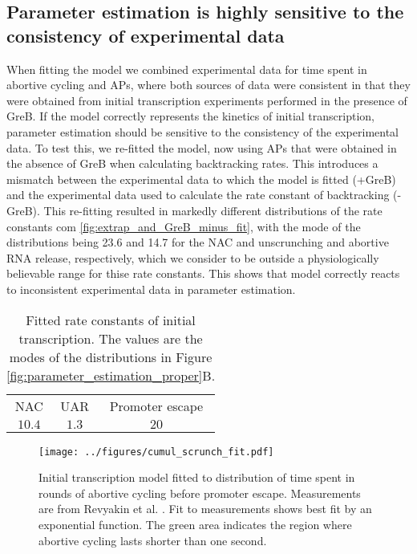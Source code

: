 \subsection{Parameter estimation is highly sensitive to the consistency of experimental data}
When fitting the model we combined experimental data for time spent in
abortive cycling and APs, where both sources of data were consistent in that
they were obtained from initial transcription experiments performed in the
presence of GreB. If the model correctly represents the kinetics of initial
transcription, parameter estimation should be sensitive to the consistency of
the experimental data. To test this, we re-fitted the model, now using APs
that were obtained in the absence of GreB when calculating backtracking rates.
This introduces a mismatch between the experimental data to which the model is
fitted (+GreB) and the experimental data used to calculate the rate constant
of backtracking (-GreB). This re-fitting resulted in markedly different
distributions of the rate constants com \ref{fig:extrap_and_GreB_minus_fit},
with the mode of the distributions being 23.6 and 14.7 for the NAC and
unscrunching and abortive RNA release, respectively, which we consider to be
outside a physiologically believable range for thise rate constants. This
shows that model correctly reacts to inconsistent experimental data in
parameter estimation.

\begin{table}
  \label{tab:param_fit_revyakin}
  \caption{Fitted rate constants of initial transcription. The values are the
    modes of the distributions in Figure \ref{fig:parameter_estimation_proper}B.}
  \begin{center}
    \begin{tabular}{ccc}
       \toprule
       NAC & UAR & Promoter escape \\
       $10.4$ & $1.3$ & $20$ \\
    \end{tabular}
  \end{center}
\end{table}


\begin{figure}
    \begin{center}
      \texttt{[image: ../figures/cumul\_scrunch\_fit.pdf]}
    \end{center}
    \caption{Initial transcription model fitted to distribution of time spent
      in rounds of abortive cycling before promoter escape. Measurements are
      from Revyakin et al. \cite{revyakin_abortive_2006}. Fit to measurements
      shows best fit by an exponential function. The green area indicates the
      region where abortive cycling lasts shorter than one second.}
\label{fig:revyakin_fit}
\end{figure}


